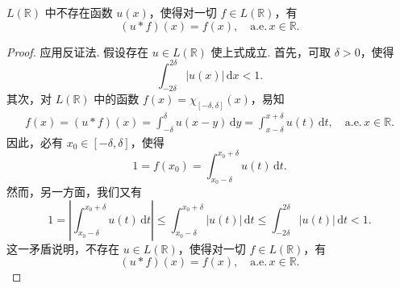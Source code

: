 \documentclass[../../main.tex]{subfiles}
\begin{document}
\begin{proposition}[\( L \) 中无卷积单位]\label{proposition:L中无卷积单位}
\( L(\mathbb{R}) \) 中不存在函数 \( u(x) \)，使得对一切 \( f \in L(\mathbb{R}) \)，有
\[
(u * f)(x) = f(x), \quad \text{a.e.}\, x \in \mathbb{R}.
\]
\end{proposition}
\begin{proof}
应用反证法. 假设存在 \( u \in L(\mathbb{R}) \) 使上式成立. 首先，可取 \( \delta > 0 \)，使得
\[
\int_{-2\delta}^{2\delta} |u(x)| \, \mathrm{d}x < 1.
\]
其次，对 \( L(\mathbb{R}) \) 中的函数 \( f(x) = \chi_{[-\delta, \delta]}(x) \)，易知
\begin{align*}
f(x) = (u * f)(x) = \int_{-\delta}^{\delta} u(x - y) \, \mathrm{d}y = \int_{x - \delta}^{x + \delta} u(t) \, \mathrm{d}t, \quad \text{a.e.}\, x \in \mathbb{R}.
\end{align*}
因此，必有 \( x_0 \in [-\delta, \delta] \)，使得
\[
1 = f(x_0) = \int_{x_0 - \delta}^{x_0 + \delta} u(t) \, \mathrm{d}t.
\]
然而，另一方面，我们又有
\[
1 = \left| \int_{x_0 - \delta}^{x_0 + \delta} u(t) \, \mathrm{d}t \right| \leqslant  \int_{x_0 - \delta}^{x_0 + \delta} |u(t)| \, \mathrm{d}t \leqslant  \int_{-2\delta}^{2\delta} |u(t)| \, \mathrm{d}t < 1.
\]
这一矛盾说明，不存在 \( u \in L(\mathbb{R}) \)，使得对一切 \( f \in L(\mathbb{R}) \)，有
\[
(u * f)(x) = f(x), \quad \text{a.e.}\, x \in \mathbb{R}.
\]

\end{proof}
\end{document}
